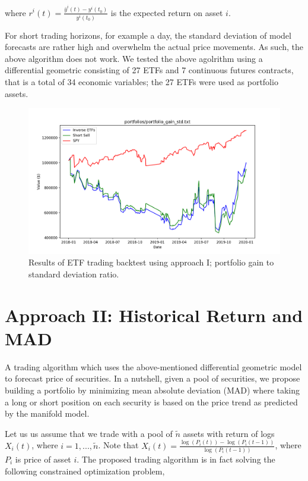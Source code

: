 \documentclass{article}
\begin{document}
where $r^{i}(t) = \frac{\bar{y}^{i}(t)-y^{i}(t_{0})}{y^{i}(t_{0})}$ is
the expected return on asset $i$.

For short trading horizons, for example a day, the standard deviation
of model forecasts are rather high and overwhelm the actual price
movements. As such, the above algorithm does not work. We tested the
above agolrithm using a differential geometric consisting of 27 ETFs
and 7 continuous futures contracts, that is a total of 34 economic
variables; the 27 ETFs were used as portfolio assets.

\begin{figure}
\includegraphics[scale=0.42,bb=0 0 320 240]{figures/Gain_std_maximization.png}
\caption{Results of ETF trading backtest using approach I; portfolio
  gain to standard deviation ratio.}
\label{fig:etf-results-approach-1}
\end{figure}

\section{Approach II: Historical Return and MAD}\label{section:approach-2}






A trading algorithm which uses the above-mentioned differential
geometric model to forecast price of securities. In a nutshell, given
a pool of securities, we propose building a portfolio by minimizing
mean absolute deviation (MAD) where taking a long or short position on
each security is based on the price trend as predicted by the manifold
model.

Let us us assume that we trade with a pool of $\tilde{n}$ assets with
return of logs $X_{i}(t)$, where $i = 1, ...,\tilde{n}$. Note that
$X_{i}(t) = \frac{\log(P_{i}(t))
  -\log(P_{i}(t-1))}{\log(P_{i}(t-1))}$, where $P_{i}$ is price of
asset $i$. The proposed trading algorithm is in fact solving the
following constrained optimization problem,
\end{document}
